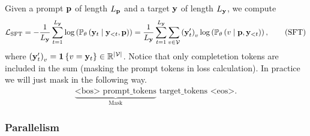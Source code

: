 \documentclass[11pt]{article}  %
\begin{document}
Given a prompt $\mathbf{p}$ of length $L_{\mathbf{p}}$ and a target $\mathbf{y}$ of length $L_{\mathbf{y}}$, we compute 
\begin{align}
  \label{eq:lossSFT}
  \mathcal{L}_{\text{SFT}} = -\frac{1}{L_{\mathbf{y}}} \sum_{t=1}^{L_{\mathbf{y}}} \log \left( \mathbb{P}_{\theta}\left( \mathbf{y}_t \mid \mathbf{y}_{< t}, \mathbf{p} \right) \right) = \frac{1}{L_{\mathbf{y}}}\sum_{t=1}^{L_{\mathbf{y}}}\sum_{v \in \mathcal{V}}\left( \mathbf{y}^\prime_t \right)_v\log\left( \mathbb{P}_{\theta}\left( v \mid \mathbf{p}, \mathbf{y}_{< t} \right) \right), \tag{SFT}
\end{align}
where $\left( \mathbf{y}^\prime_t \right)_v = \mathbf{1}\left\{ v = \mathbf{y}_t \right\} \in \mathbb{R}^{\lvert\mathcal{V}\rvert}$.
Notice that only completetion tokens are included in the sum (masking the prompt tokens in loss calculation).
In practice we will just mask in the following way.
\begin{align*}
  \underbrace{\text{<bos>  } \text{prompt\_tokens}}_{\text{Mask}} \text{ target\_tokens } \text{<eos>}. 
\end{align*}



\subsubsection{Parallelism}
\end{document}
